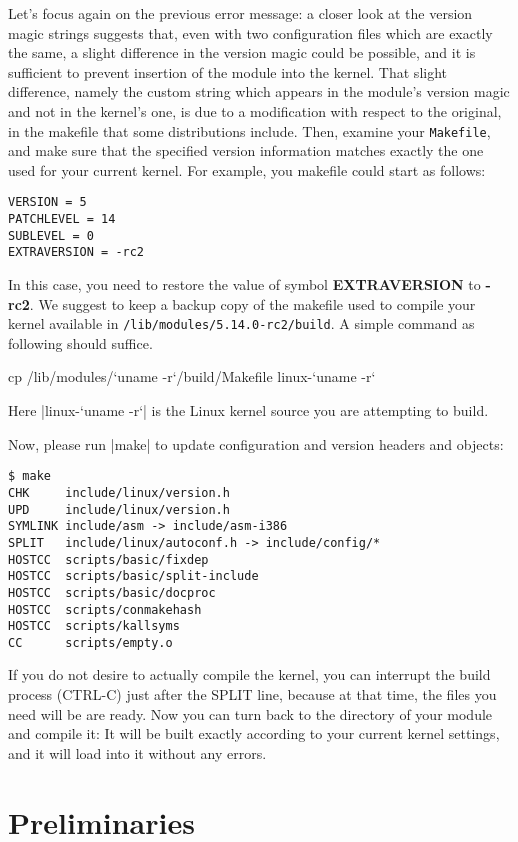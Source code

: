 \documentclass[10pt, oneside]{book}
\begin{document}
Let's focus again on the previous error message: a closer look at the version magic strings suggests that, even with two configuration files which are exactly the same, a slight difference in the version magic could be possible, and it is sufficient to prevent insertion of the module into the kernel.
That slight difference, namely the custom string which appears in the module's version magic and not in the kernel's one, is due to a modification with respect to the original, in the makefile that some distributions include.
Then, examine your \verb|Makefile|, and make sure that the specified version information matches exactly the one used for your current kernel.
For example, you makefile could start as follows:

\begin{verbatim}
VERSION = 5
PATCHLEVEL = 14
SUBLEVEL = 0
EXTRAVERSION = -rc2
\end{verbatim}

In this case, you need to restore the value of symbol \textbf{EXTRAVERSION} to \textbf{-rc2}.
We suggest to keep a backup copy of the makefile used to compile your kernel available in \verb|/lib/modules/5.14.0-rc2/build|.
A simple command as following should suffice.
\begin{codebash}
cp /lib/modules/`uname -r`/build/Makefile linux-`uname -r`
\end{codebash}
Here \sh|linux-`uname -r`| is the Linux kernel source you are attempting to build.

Now, please run \sh|make| to update configuration and version headers and objects:

\begin{verbatim}
$ make
CHK     include/linux/version.h
UPD     include/linux/version.h
SYMLINK include/asm -> include/asm-i386
SPLIT   include/linux/autoconf.h -> include/config/*
HOSTCC  scripts/basic/fixdep
HOSTCC  scripts/basic/split-include
HOSTCC  scripts/basic/docproc
HOSTCC  scripts/conmakehash
HOSTCC  scripts/kallsyms
CC      scripts/empty.o
\end{verbatim}

If you do not desire to actually compile the kernel, you can interrupt the build process (CTRL-C) just after the SPLIT line, because at that time, the files you need will be are ready.
Now you can turn back to the directory of your module and compile it: It will be built exactly according to your current kernel settings, and it will load into it without any errors.

\section{Preliminaries}
\end{document}
